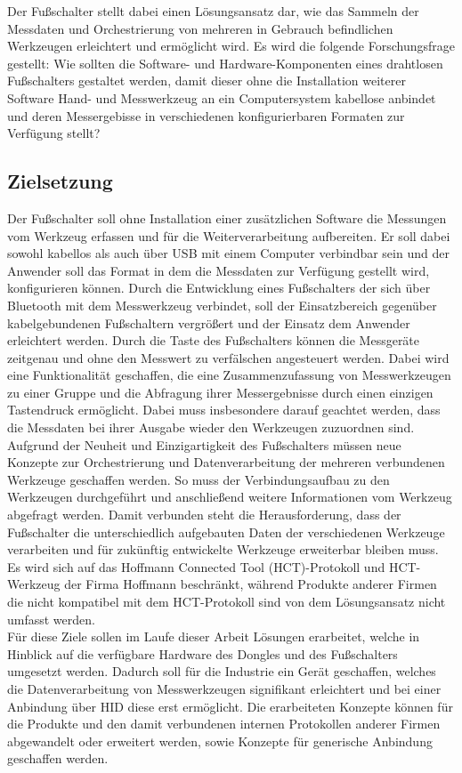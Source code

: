 Der Fußschalter stellt dabei einen Lösungsansatz dar, wie das Sammeln der Messdaten und Orchestrierung von mehreren in Gebrauch befindlichen Werkzeugen erleichtert und ermöglicht wird. Es wird die folgende Forschungsfrage gestellt: Wie sollten die Software- und Hardware-Komponenten eines drahtlosen Fußschalters gestaltet werden, damit dieser ohne die Installation weiterer Software Hand- und Messwerkzeug an ein Computersystem kabellose anbindet und deren Messergebisse in verschiedenen konfigurierbaren Formaten zur Verfügung stellt?

\subsection{Zielsetzung}
Der Fußschalter soll ohne Installation einer zusätzlichen Software die Messungen vom Werkzeug erfassen und für die Weiterverarbeitung aufbereiten. Er soll dabei sowohl kabellos als auch über USB mit einem Computer verbindbar sein und der Anwender soll das Format in dem die Messdaten zur Verfügung gestellt wird, konfigurieren können. Durch die Entwicklung eines Fußschalters der sich über Bluetooth mit dem Messwerkzeug verbindet, soll der Einsatzbereich gegenüber kabelgebundenen Fußschaltern vergrößert und der Einsatz dem Anwender erleichtert werden. Durch die Taste des Fußschalters können die Messgeräte zeitgenau und ohne den Messwert zu verfälschen angesteuert werden. Dabei wird eine Funktionalität geschaffen, die eine Zusammenzufassung von Messwerkzeugen zu einer Gruppe und die Abfragung ihrer Messergebnisse durch einen einzigen Tastendruck ermöglicht. Dabei muss insbesondere darauf geachtet werden, dass die Messdaten bei ihrer Ausgabe wieder den Werkzeugen zuzuordnen sind.\\
Aufgrund der Neuheit und Einzigartigkeit des Fußschalters müssen neue Konzepte zur Orchestrierung und Datenverarbeitung der mehreren verbundenen Werkzeuge geschaffen werden. So muss der Verbindungsaufbau zu den Werkzeugen durchgeführt und anschließend weitere Informationen vom Werkzeug abgefragt werden. Damit verbunden steht die Herausforderung, dass der Fußschalter die unterschiedlich aufgebauten Daten der verschiedenen Werkzeuge verarbeiten und für zukünftig entwickelte Werkzeuge erweiterbar bleiben muss. Es wird sich auf das Hoffmann Connected Tool (\ac{HCT})-Protokoll und \ac{HCT}-Werkzeug der Firma Hoffmann beschränkt, während Produkte anderer Firmen die nicht kompatibel mit dem \ac{HCT}-Protokoll sind von dem Lösungsansatz nicht umfasst werden.\\
Für diese Ziele sollen im Laufe dieser Arbeit Lösungen erarbeitet, welche in Hinblick auf die verfügbare Hardware des Dongles und des Fußschalters umgesetzt werden. Dadurch soll für die Industrie ein Gerät geschaffen, welches die Datenverarbeitung von Messwerkzeugen signifikant erleichtert und bei einer Anbindung über \ac{HID} diese erst ermöglicht. Die erarbeiteten Konzepte können für die Produkte und den damit verbundenen internen Protokollen anderer Firmen abgewandelt oder erweitert werden, sowie Konzepte für generische Anbindung geschaffen werden.

